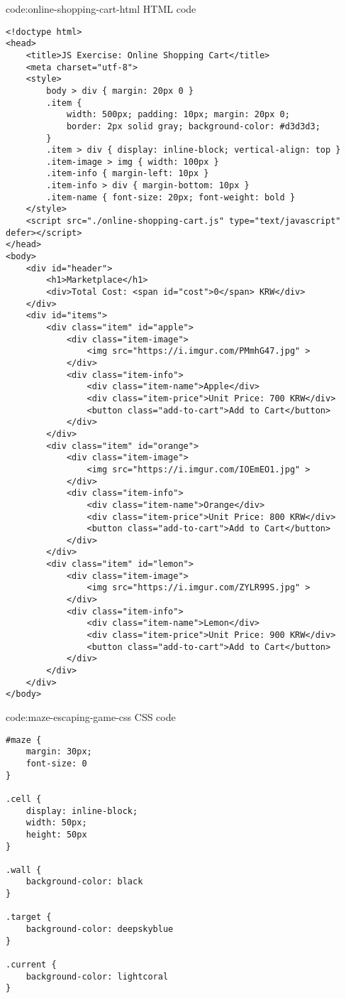 \begin{codeenv}{code:online-shopping-cart-html}{ HTML code}
\begin{verbatim}
<!doctype html>
<head>
    <title>JS Exercise: Online Shopping Cart</title>
    <meta charset="utf-8">
    <style>
        body > div { margin: 20px 0 }
        .item {
            width: 500px; padding: 10px; margin: 20px 0;
            border: 2px solid gray; background-color: #d3d3d3;
        }
        .item > div { display: inline-block; vertical-align: top }
        .item-image > img { width: 100px }
        .item-info { margin-left: 10px }
        .item-info > div { margin-bottom: 10px }
        .item-name { font-size: 20px; font-weight: bold }
    </style>
    <script src="./online-shopping-cart.js" type="text/javascript" defer></script>
</head>
<body>
    <div id="header">
        <h1>Marketplace</h1>
        <div>Total Cost: <span id="cost">0</span> KRW</div>
    </div>
    <div id="items">
        <div class="item" id="apple">
            <div class="item-image">
                <img src="https://i.imgur.com/PMmhG47.jpg" >
            </div>
            <div class="item-info">
                <div class="item-name">Apple</div>
                <div class="item-price">Unit Price: 700 KRW</div>
                <button class="add-to-cart">Add to Cart</button>
            </div>
        </div>
        <div class="item" id="orange">
            <div class="item-image">
                <img src="https://i.imgur.com/IOEmEO1.jpg" >
            </div>
            <div class="item-info">
                <div class="item-name">Orange</div>
                <div class="item-price">Unit Price: 800 KRW</div>
                <button class="add-to-cart">Add to Cart</button>
            </div>
        </div>
        <div class="item" id="lemon">
            <div class="item-image">
                <img src="https://i.imgur.com/ZYLR99S.jpg" >
            </div>
            <div class="item-info">
                <div class="item-name">Lemon</div>
                <div class="item-price">Unit Price: 900 KRW</div>
                <button class="add-to-cart">Add to Cart</button>
            </div>
        </div>
    </div>
</body>
\end{verbatim}
\end{codeenv}

\begin{codeenv}{code:maze-escaping-game-css}{ CSS code}
\begin{verbatim}
#maze {
    margin: 30px;
    font-size: 0
}

.cell {
    display: inline-block;
    width: 50px;
    height: 50px
}

.wall {
    background-color: black
}

.target {
    background-color: deepskyblue
}

.current {
    background-color: lightcoral
}
\end{verbatim}
\end{codeenv}

